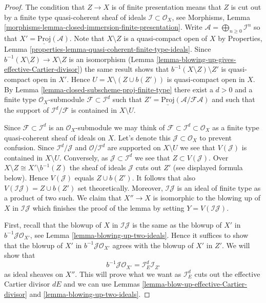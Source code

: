\begin{proof}
The condition that $Z \to X$ is of finite presentation means that
$Z$ is cut out by a finite type quasi-coherent sheaf of ideals
$\mathcal{I} \subset \mathcal{O}_X$, see
Morphisms, Lemma \ref{morphisms-lemma-closed-immersion-finite-presentation}.
Write $\mathcal{A} = \bigoplus_{n \geq 0} \mathcal{I}^n$ so that
$X' = \underline{\text{Proj}}(\mathcal{A})$.
Note that $X \setminus Z$ is a quasi-compact open of $X$ by
Properties, Lemma \ref{properties-lemma-quasi-coherent-finite-type-ideals}.
Since $b^{-1}(X \setminus Z) \to X \setminus Z$ is an isomorphism
(Lemma \ref{lemma-blowing-up-gives-effective-Cartier-divisor}) the same
result shows that
$b^{-1}(X \setminus Z) \setminus Z'$ is quasi-compact open in $X'$.
Hence $U = X \setminus (Z \cup b(Z'))$ is quasi-compact open in $X$.
By Lemma \ref{lemma-closed-subscheme-proj-finite-type}
there exist a $d > 0$ and a finite type
$\mathcal{O}_X$-submodule $\mathcal{F} \subset \mathcal{I}^d$ such
that $Z' = \underline{\text{Proj}}(\mathcal{A}/\mathcal{F}\mathcal{A})$
and such that the support of $\mathcal{I}^d/\mathcal{F}$ is contained
in $X \setminus U$.

\medskip\noindent
Since $\mathcal{F} \subset \mathcal{I}^d$ is an $\mathcal{O}_X$-submodule
we may think of $\mathcal{F} \subset \mathcal{I}^d \subset \mathcal{O}_X$
as a finite type quasi-coherent sheaf of ideals on $X$. Let's denote this
$\mathcal{J} \subset \mathcal{O}_X$ to prevent confusion. Since
$\mathcal{I}^d / \mathcal{J}$ and $\mathcal{O}/\mathcal{I}^d$
are supported on $X \setminus U$ we see that $V(\mathcal{J})$ is contained
in $X \setminus U$. Conversely, as $\mathcal{J} \subset \mathcal{I}^d$
we see that $Z \subset V(\mathcal{J})$. Over
$X \setminus Z \cong X' \setminus b^{-1}(Z)$ the sheaf of ideals
$\mathcal{J}$ cuts out $Z'$ (see displayed formula below). Hence
$V(\mathcal{J})$ equals $Z \cup b(Z')$. It follows that also
$V(\mathcal{I}\mathcal{J}) = Z \cup b(Z')$ set theoretically. Moreover,
$\mathcal{I}\mathcal{J}$ is an ideal of finite type as a product of two such.
We claim that $X'' \to X$ is isomorphic to the blowing up of $X$ in
$\mathcal{I}\mathcal{J}$ which finishes the proof of the lemma by setting
$Y = V(\mathcal{I}\mathcal{J})$.

\medskip\noindent
First, recall that the blowup of $X$ in $\mathcal{I}\mathcal{J}$
is the same as the blowup of $X'$ in $b^{-1}\mathcal{J} \mathcal{O}_{X'}$,
see Lemma \ref{lemma-blowing-up-two-ideals}.
Hence it suffices to show that the blowup of $X'$ in
$b^{-1}\mathcal{J} \mathcal{O}_{X'}$ agrees with the blowup of $X'$
in $Z'$. We will show that
$$
b^{-1}\mathcal{J} \mathcal{O}_{X'} = \mathcal{I}_E^d \mathcal{I}_{Z'}
$$
as ideal sheaves on $X''$. This will prove what we want as
$\mathcal{I}_E^d$ cuts out the effective Cartier divisor $dE$
and we can use Lemmas \ref{lemma-blow-up-effective-Cartier-divisor} and
\ref{lemma-blowing-up-two-ideals}.


\end{proof}
